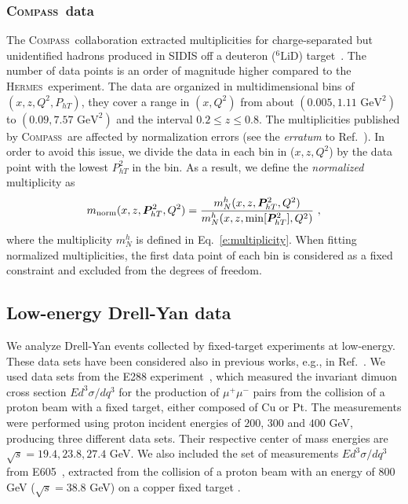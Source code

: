 \documentclass[aps,preprintnumbers,showpacs,nofootinbib,superscriptaddress,floatfix]{revtex4}
\newcommand{\hermes}{\textsc{Hermes}}
\newcommand{\compass}{\textsc{Compass}}
\newcommand{\Tperp}{T}
\begin{document}
\subsubsection{\compass\ data}
\label{sss:compass}

The \compass\ collaboration extracted multiplicities for charge-separated but
unidentified hadrons produced in SIDIS off a deuteron ($^6\text{LiD}$)
target~\cite{Adolph:2013stb}.  The number of data points is an order of magnitude higher compared to the \hermes\ experiment.
The data are organized in multidimensional bins of $(x,z,Q^2,P_{h\Tperp})$,
they cover a range in $(x,Q^2)$ from about $(0.005, 1.11\text{ GeV}^2)$ to
$(0.09, 7.57\text{ GeV}^2)$ and the interval $0.2 \leq z \leq 0.8$. 
The multiplicities published by \compass\ are affected by normalization
errors (see the {\em erratum} to Ref.~\cite{Adolph:2013stb}). In order to
avoid this issue, we divide the data in each bin in ($x, z, Q^2$) by the data
point with the lowest $P_{hT}^2$ in the bin. 
As a result, we define the {\em normalized} multiplicity as
\begin{equation}
m_{\text{norm}}(x,z,\bm{P}_{h\Tperp}^2, Q^2) = \frac{m_N^h(x,z,\bm{P}_{h\Tperp}^2, Q^2)}{m_N^h (x,z,{\rm \min}[\bm{P}_{h\Tperp}^2], Q^2)} \ ,
\label{e:mult_norm}
\end{equation}
where the multiplicity $m_N^h$ is defined in Eq.~\eqref{e:multiplicity}. When
fitting normalized multiplicities, the first data point of each bin is
considered as a fixed constraint and excluded from the degrees of freedom.

\subsection{Low-energy Drell-Yan data}
\label{ss:dy}

We analyze Drell-Yan events collected by fixed-target experiments at
low-energy. These data sets have been considered also in previous works, e.g.,
in Ref.~\cite{Landry:1999an,Landry:2002ix,Konychev:2005iy,DAlesio:2014mrz}. 
We used data sets from the E288 experiment~\cite{Ito:1980ev}, which measured the invariant dimuon cross section $E d^3\sigma / dq^3$ for the production of $\mu^+ \mu^-$ pairs from the collision of a proton beam with a fixed target, either composed of Cu or Pt.
The measurements were performed using proton incident energies of $200$, $300$ and $400$ GeV, producing three different data sets.
Their respective center of mass energies are $\sqrt{s}=19.4,23.8,27.4$ GeV.
We also included the set of measurements $E d^3\sigma / dq^3$ from E605~\cite{Moreno:1990sf}, extracted from the collision of a proton beam with an energy of $800$ GeV ($\sqrt{s}=38.8$ GeV) on a copper fixed target .
\end{document}
